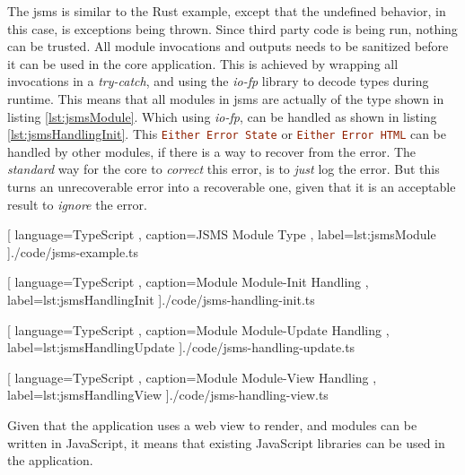 The \gls{jsms} is similar to the Rust example, except that the undefined
behavior, in this case, is exceptions being thrown. Since third party code is
being run, nothing can be trusted.
All module invocations and outputs needs to be sanitized before it can be used
in the core application. This is achieved by wrapping all invocations in a
\textit{try-catch}, and using the \textit{io-fp} library to decode types during
runtime. This means that all modules in \gls{jsms} are actually of the type
shown in listing \ref{lst:jsmsModule}. Which using \textit{io-fp}, can be
handled as shown in listing \ref{lst:jsmsHandlingInit}. This
\lstinline[language=Haskell]{Either Error State} or
\lstinline[language=Haskell]{Either Error HTML} can be handled by other modules,
if there is a way to recover from the error. The \textit{standard} way for the
core to \textit{correct} this error, is to \textit{just} log the error. But this
turns an unrecoverable error into a recoverable one, given that it is an
acceptable result to \textit{ignore} the error.

\begin{center}
  
    [ language=TypeScript
    , caption={JSMS Module Type}
    , label=lst:jsmsModule
    ]{./code/jsms-example.ts}
\end{center}

\begin{center}
  
    [ language=TypeScript
    , caption={Module Module-Init Handling}
    , label=lst:jsmsHandlingInit
    ]{./code/jsms-handling-init.ts}
\end{center}

\begin{center}
  
    [ language=TypeScript
    , caption={Module Module-Update Handling}
    , label=lst:jsmsHandlingUpdate
    ]{./code/jsms-handling-update.ts}
\end{center}

\begin{center}
  
    [ language=TypeScript
    , caption={Module Module-View Handling}
    , label=lst:jsmsHandlingView
    ]{./code/jsms-handling-view.ts}
\end{center}

Given that the application uses a web view to render, and modules can be written
in JavaScript, it means that existing JavaScript libraries can be used in the
application.

